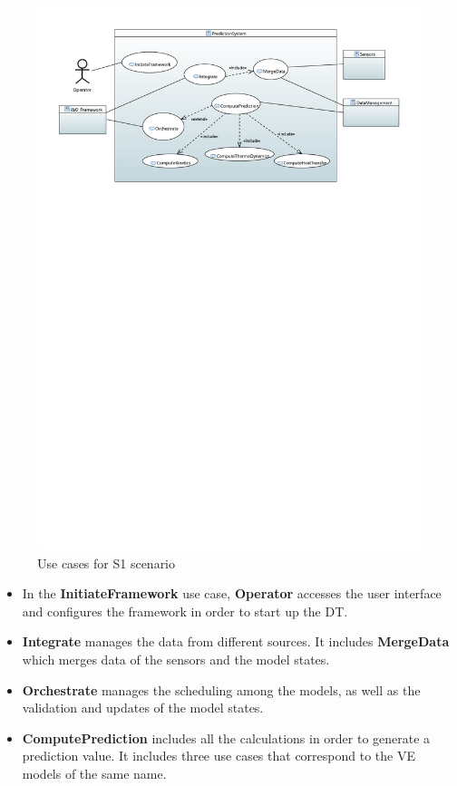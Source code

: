 \begin{figure}[hbt!]
  \centering
  \includegraphics[scale=0.8]{figures/usecase1.pdf}
  \caption{Use cases for S1 scenario}
  \label{fig:usecase1}
\end{figure}

\begin{itemize}
\item In the \textbf{InitiateFramework} use case, \textbf{Operator} accesses the user interface and configures the framework in order to start up the DT.  

\item \textbf{Integrate} manages the data from different sources. It includes \textbf{MergeData} which merges data of the sensors and the model states.

\item \textbf{Orchestrate} manages the scheduling among the models, as well as the validation and updates of the model states.

\item \textbf{ComputePrediction} includes all the calculations in order to generate a prediction value. It includes three use cases that correspond to the VE models of the same name.

\end{itemize}

